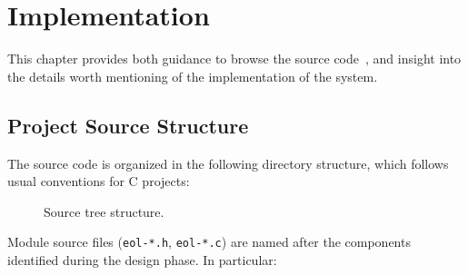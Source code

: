 
\setchaptertoc
\chapter{Implementation}

This chapter provides both guidance to browse the \Eol* source
code~\cite{eol-github}, and insight into the details worth
mentioning of the implementation of the system.

\afterintro


\section{Project Source Structure}

The \Eol* source code is organized in the following directory structure, which
follows usual conventions for C projects:

\begin{figure}[h]
    \centering
    \noindent\begin{minipage}{0.75\textwidth}
    \end{minipage}
    \caption{Source tree structure.}
\end{figure}

Module source files (\verb|eol-*.h|, \verb|eol-*.c|) are named after the
components identified during the design phase. In particular:

